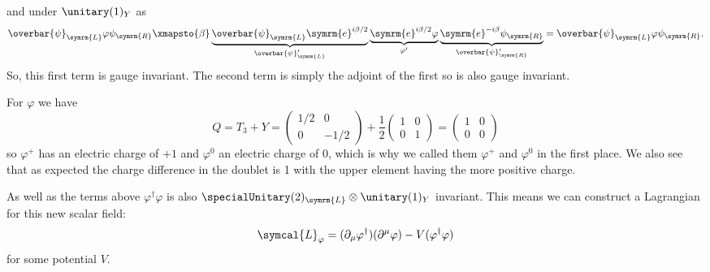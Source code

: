 \documentclass[fleqn]{NotesClass}
\newcommand{\e}{\symrm{e}}
\newcommand{\diracadjoint}[1]{\overbar{#1}}
\newcommand{\hermit}{\dagger}
\newcommand{\lagrangianDensity}{\symcal{L}}
\newcommand{\Left}{\symrm{L}}
\newcommand{\Right}{\symrm{R}}
\begin{document}
    and under \(\unitary(1)_Y\) as
    \begin{equation}
        \diracadjoint{\psi}_{\Left}\varphi\psi_{\Right} \xmapsto{\beta} \underbrace{\diracadjoint{\psi}_{\Left}\e^{i\beta/2}}_{\diracadjoint{\psi}_{\Left}'}\underbrace{\e^{i\beta/2}\varphi}_{\varphi'} \underbrace{\e^{-i\beta}\psi_{\Right}}_{\diracadjoint{\psi}_{\Right}'} = \diracadjoint{\psi}_{\Left} \varphi \psi_{\Right}.
    \end{equation}
    So, this first term is gauge invariant.
    The second term is simply the adjoint of the first so is also gauge invariant.
    
    For \(\varphi\) we have
    \begin{equation}
        Q = T_3 + Y = 
        \begin{pmatrix}
            1/2 & 0\\
            0 & -1/2
        \end{pmatrix}
        + \frac{1}{2}
        \begin{pmatrix}
            1 & 0\\
            0 & 1
        \end{pmatrix}
        =
        \begin{pmatrix}
            1 & 0\\
            0 & 0
        \end{pmatrix}
    \end{equation}
    so \(\varphi^+\) has an electric charge of \(+1\) and \(\varphi^0\) an electric charge of \(0\), which is why we called them \(\varphi^+\) and \(\varphi^0\) in the first place.
    We also see that as expected the charge difference in the doublet is 1 with the upper element having the more positive charge.
    
    As well as the terms above \(\varphi^\hermit \varphi\) is also \(\specialUnitary(2)_{\Left} \otimes \unitary(1)_Y\) invariant.
    This means we can construct a Lagrangian for this new scalar field:
    \begin{equation}
        \lagrangianDensity_\varphi = (\partial_\mu \varphi^\hermit)(\partial^\mu \varphi) - V(\varphi^\hermit \varphi)
    \end{equation}
    for some potential \(V\).
    
\end{document}
